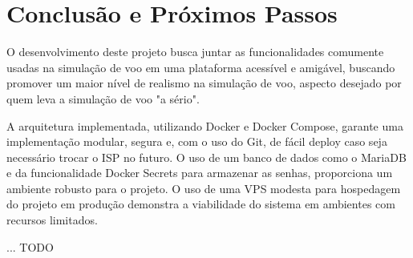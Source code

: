\chapter{Conclusão e Próximos Passos}

O desenvolvimento deste projeto busca juntar as funcionalidades comumente usadas na 
simulação de voo em uma plataforma acessível e amigável, buscando promover um 
maior nível de realismo na simulação de voo, aspecto desejado por quem leva
a simulação de voo "a sério".

A arquitetura implementada, utilizando Docker e Docker Compose, garante uma 
implementação modular, segura e, com o uso do Git, de fácil deploy caso seja 
necessário trocar o ISP no futuro. O uso de um banco de dados como
o MariaDB e da funcionalidade Docker Secrets para armazenar as senhas, proporciona um 
ambiente robusto para o projeto.
O uso de uma VPS modesta para hospedagem do projeto em produção demonstra a 
viabilidade do sistema em ambientes com recursos limitados.

... TODO